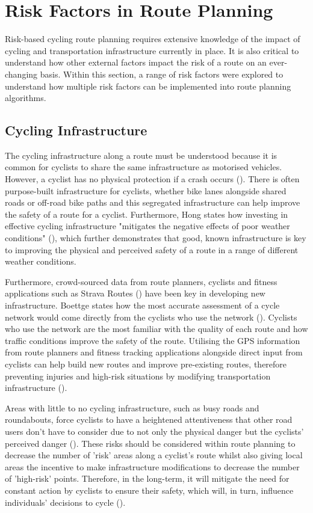 \section{Risk Factors in Route Planning}
Risk-based cycling route planning requires extensive knowledge of the impact of cycling and transportation infrastructure currently in place. It is also critical to understand how other external factors impact the risk of a route on an ever-changing basis. Within this section, a range of risk factors were explored to understand how multiple risk factors can be implemented into route planning algorithms.

\subsection{Cycling Infrastructure}
\label{litrev:cyclinginfrastructure}
The cycling infrastructure along a route must be understood because it is common for cyclists to share the same infrastructure as motorised vehicles. However, a cyclist has no physical protection if a crash occurs (\cite{reynolds_impact_2009}). There is often purpose-built infrastructure for cyclists, whether bike lanes alongside shared roads or off-road bike paths and this segregated infrastructure can help improve the safety of a route for a cyclist. Furthermore, Hong states how investing in effective cycling infrastructure "mitigates the negative effects of poor weather conditions" (\cite{hong_can_2020}), which further demonstrates that good, known infrastructure is key to improving the physical and perceived safety of a route in a range of different weather conditions. 

Furthermore, crowd-sourced data from route planners, cyclists and fitness applications such as Strava Routes (\cite{noauthor_strava_nodate}) have been key in developing new infrastructure. Boettge states how the most accurate assessment of a cycle network would come directly from the cyclists who use the network (\cite{boettge_assessing_2017}). Cyclists who use the network are the most familiar with the quality of each route and how traffic conditions improve the safety of the route. Utilising the GPS information from route planners and fitness tracking applications alongside direct input from cyclists can help build new routes and improve pre-existing routes, therefore preventing injuries and high-risk situations by modifying transportation infrastructure (\cite{reynolds_impact_2009}).

Areas with little to no cycling infrastructure, such as busy roads and roundabouts, force cyclists to have a heightened attentiveness that other road users don't have to consider due to not only the physical danger but the cyclists' perceived danger (\cite{doorley_analysis_2015}). These risks should be considered within route planning to decrease the number of 'risk' areas along a cyclist's route whilst also giving local areas the incentive to make infrastructure modifications to decrease the number of 'high-risk' points. Therefore, in the long-term, it will mitigate the need for constant action by cyclists to ensure their safety, which will, in turn, influence individuals' decisions to cycle (\cite{reynolds_impact_2009}).

